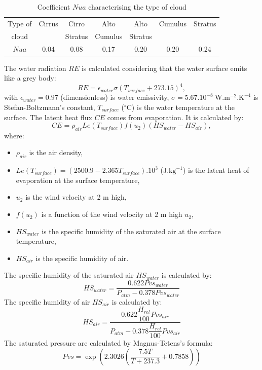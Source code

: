 \begin{table}[ptbh]
\caption{Coefficient $Nua$ characterising the type of cloud }%
\label{tab_cloud_type}%
\centering
\begin{tabular}
[c]{|c|c|c|c|c|c|c|}\hline
Type of & Cirrus & Cirro & Alto & Alto & Cumulus & Stratus\\
cloud &  & Stratus & Cumulus & Stratus &  & \\\hline
$Nua$ & 0.04 & 0.08 & 0.17 & 0.20 & 0.20 & 0.24\\\hline
\end{tabular}
\end{table}

The water radiation $RE$ is calculated considering that the water surface
emits like a grey body:
\begin{equation}
RE = \epsilon_{water} \sigma(T_{surface}+273.15)^{4},
\end{equation}
with $\epsilon_{water} = 0.97$ (dimensionless) is water emissivity, $\sigma=
5.67.10^{-8}~\mathrm{{W.m^{-2}.K^{-4}}}$ is Stefan-Boltzmann's constant,
$T_{surface}$ ($^{\circ}$C) is the water temperature at the surface.
The latent heat flux $CE$ comes from evaporation. It is calculated by:
\begin{equation}
CE = \rho_{air}Le(T_{surface})f(u_{2})(HS_{water}-HS_{air}),
\end{equation}
where:
\begin{itemize}
\item $\rho_{air}$ is the air density,
\item $Le(T_{surface}) = (2500.9-2.365 T_{surface}).10^{3}$ ($\mathrm{{J}%
.{kg}^{-1}}$) is the latent heat of evaporation at the surface temperature,
\item $u_{2}$ is the wind velocity at 2 m high,
\item $f(u_{2})$ is a function of the wind velocity at 2 m high $u_{2}$,
\item $HS_{water}$ is the specific humidity of the saturated air at the
surface temperature,
\item $HS_{air}$ is the specific humidity of air.
\end{itemize}

The specific humidity of the saturated air $HS_{water}$ is calculated by:
\begin{equation}
HS_{water} = \dfrac{0.622 Pvs_{water}}{P_{atm}-0.378 Pvs_{water}}%
\end{equation}
The specific humidity of air $HS_{air}$ is calculated by:
\begin{equation}
HS_{air} = \dfrac{0.622 \dfrac{H_{rel}}{100} Pvs_{air}} {P_{atm}-0.378
\dfrac{H_{rel}}{100} Pvs_{air}}%
\end{equation}
The saturated pressure are calculated by Magnus-Tetens's formula:
\begin{equation}
Pvs = \exp\left(  2.3026 \left(  \dfrac{7.5 T}{T+237.3} +0.7858 \right)
\right)
\end{equation}
\newline

